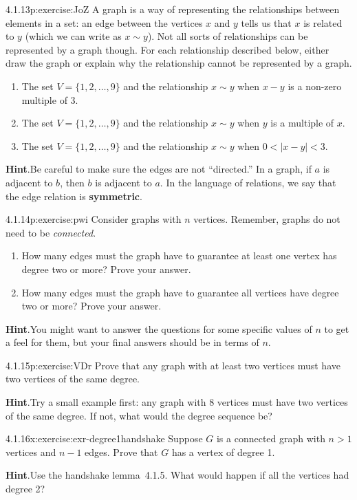 \documentclass[twoside,11pt,]{book}
\newcommand{\blocktitlefont}{\relax}
\newcommand{\terminology}[1]{\textbf{#1}}
\numberwithin{equation}{chapter}
\newcommand{\lt}{<}
\begin{document}
\begin{divisionsolution}{4.1.13}{}{p:exercise:JoZ}%
A graph is a way of representing the relationships between elements in a set: an edge between the vertices \(x\) and \(y\) tells us that \(x\) is related to \(y\) (which we can write as \(x \sim y\)).  Not all sorts of relationships can be represented by a graph though.  For each relationship described below, either draw the graph or explain why the relationship cannot be represented by a graph.%
\begin{enumerate}[label=(\alph*)]
\item{}The set \(V = \{1,2, \ldots, 9\}\) and the relationship \(x \sim y\) when \(x-y\) is a non-zero multiple of 3.%
\item{}The set \(V = \{1,2, \ldots, 9\}\) and the relationship \(x \sim y\) when \(y\) is a multiple of \(x\).%
\item{}The set \(V = \{1,2,\ldots, 9\}\) and the relationship \(x \sim y\) when \(0 \lt |x-y| \lt 3\).%
\end{enumerate}
%
\par\smallskip%
\noindent\textbf{\blocktitlefont Hint}.\quad{}Be careful to make sure the edges are not ``directed.''  In a graph, if \(a\) is adjacent to \(b\), then \(b\) is adjacent to \(a\).  In the language of relations, we say that the edge relation is \terminology{symmetric}.%
\end{divisionsolution}%
\begin{divisionsolution}{4.1.14}{}{p:exercise:pwi}%
Consider graphs with \(n\) vertices.  Remember, graphs do not need to be \emph{connected}.%
\begin{enumerate}[label=(\alph*)]
\item{}How many edges must the graph have to guarantee at least one vertex has degree two or more?  Prove your answer.%
\item{}How many edges must the graph have to guarantee all vertices have degree two or more?  Prove your answer.%
\end{enumerate}
%
\par\smallskip%
\noindent\textbf{\blocktitlefont Hint}.\quad{}You might want to answer the questions for some specific values of \(n\) to get a feel for them, but your final answers should be in terms of \(n\).%
\end{divisionsolution}%
\begin{divisionsolution}{4.1.15}{}{p:exercise:VDr}%
Prove that any graph with at least two vertices must have two vertices of the same degree.%
\par\smallskip%
\noindent\textbf{\blocktitlefont Hint}.\quad{}Try a small example first: any graph with 8 vertices must have two vertices of the same degree.  If not, what would the degree sequence be?%
\end{divisionsolution}%
\begin{divisionsolution}{4.1.16}{}{x:exercise:exr-degree1handshake}%
Suppose \(G\) is a connected graph with \(n > 1\) vertices and \(n-1\) edges.  Prove that \(G\) has a vertex of degree 1.%
\par\smallskip%
\noindent\textbf{\blocktitlefont Hint}.\quad{}Use the handshake lemma~4.1.5.  What would happen if all the vertices had degree 2?%
\end{divisionsolution}%
\end{document}
